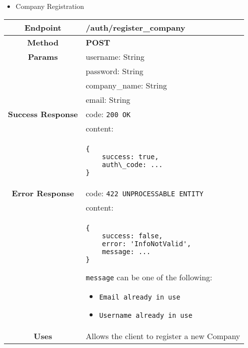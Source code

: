     \begin{itemize}
        \item Company Registration
    \end{itemize}
    \begin{adjustwidth}{1cm}{}
        \begin{tabular}{|c|l|}
            \hline
            \textbf{Endpoint} & /auth/register\_company \\
            \hline
            \textbf{Method} & \textbf{POST} \\
            \hline
            \textbf{Params} & username: String \\
            &                 password: String \\
            &                 company\_name: String \\
            &                 email: String \\
            \hline
            \textbf{Success Response} & code: \texttt{200 OK} \\
            &                           content: \\
            & \begin{minipage}[t]{0.5\textwidth}
                \begin{adjustwidth}{1.5cm}{}
                \begin{verbatim}
{
    success: true, 
    auth\_code: ...
}
                \end{verbatim}
                \end{adjustwidth}
              \end{minipage} \\
              \hline
            \textbf{Error Response} & code: \texttt{422 UNPROCESSABLE ENTITY} \\
            &                         content: \\
            & \begin{minipage}[t]{0.7\textwidth}
                \begin{adjustwidth}{1.5cm}{}
                \begin{verbatim}
{
    success: false, 
    error: 'InfoNotValid',
    message: ...
}
                \end{verbatim}
                \end{adjustwidth}
                \texttt{message} can be one of the following: 
                \begin{itemize}
                    \item \texttt{Email already in use}
                    \item \texttt{Username already in use}
                \end{itemize}
              \end{minipage} \\
              \hline
            \textbf{Uses} & Allows the client to register a new Company \\
            \hline
        \end{tabular}
    \end{adjustwidth}

